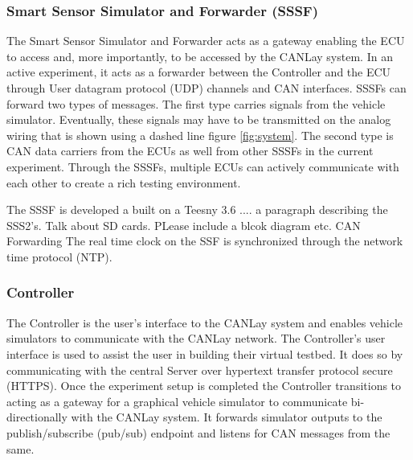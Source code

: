 \documentclass[letterpaper,twocolumn,10pt]{article}
\begin{document}
\subsubsection{Smart Sensor Simulator and Forwarder (SSSF)}
The Smart Sensor Simulator and Forwarder acts as a gateway enabling the ECU to access and, more importantly, to be accessed by the CANLay system. In an active experiment, it acts as a forwarder between the Controller and the ECU through User datagram protocol (UDP) channels and CAN interfaces. SSSFs can forward two types of messages. 
The first type carries signals from the vehicle simulator. Eventually, these signals may have to be transmitted on the analog wiring that is shown using a dashed line figure \ref{fig:system}.  
The second type is CAN data carriers from the ECUs as well from other SSSFs in the current experiment. Through the SSSFs, multiple ECUs can actively communicate with each other to create a rich testing environment.

The SSSF is developed a built on a Teesny 3.6 .... a paragraph describing the SSS2's. Talk about SD cards. PLease include a blcok diagram etc.
CAN Forwarding 
The real time clock on the SSF is synchronized through the network time protocol (NTP).

\subsubsection{Controller}
The Controller is the user's interface to the CANLay system and enables vehicle simulators to communicate with the CANLay network. The Controller’s user interface is used to assist the user in building their virtual testbed. 
It does so by communicating with the central Server over hypertext transfer protocol secure (HTTPS). 
Once the experiment setup is completed the Controller transitions to acting as a gateway for a graphical vehicle simulator to communicate bi-directionally with the CANLay system. It forwards simulator outputs to the publish/subscribe (pub/sub) endpoint and listens for CAN messages from the same.
\end{document}
